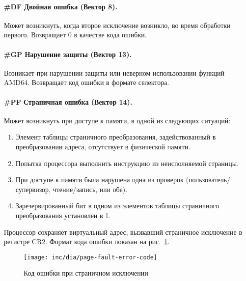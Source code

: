 \paragraph{\#DF Двойная ошибка (Вектор 8).}
Может возникнуть, когда второе исключение возникло, во время обработки
первого. Возвращает 0 в качестве кода ошибки.

\paragraph{\#GP Нарушение защиты (Вектор 13).}
Возникает при нарушении защиты или неверном использовании функций AMD64.
Возвращает код ошибки в формате селектора.

\paragraph{\#PF Страничная ошибка (Вектор 14).}
Может возникнуть при доступе к памяти, в одной из следующих ситуаций:
\begin{enumerate}[1.]
\item Элемент таблицы страничного преобразования, задействованный в
преобразовании адреса, отсутствует в физической памяти.
\item Попытка процессора выполнить инструкцию из неисполняемой страницы.
\item При доступе к памяти была нарушена одна из проверок
(пользователь/супервизор, чтение/запись, или обе).
\item Зарезервированный бит в одном из элементов таблицы страничного
преобразования установлен в 1.
\end{enumerate}

Процессор сохраняет виртуальный адрес, вызвавший страничное
исключение в регистре CR2. Формат кода ошибки показан на
рис.~\ref{fig:page_fault_error_code}.

\begin{figure}[ht!]
  \centering
  \texttt{[image: inc/dia/page-fault-error-code]}
  \caption{Код ошибки при страничном исключении}
  \label{fig:page_fault_error_code}
\end{figure}


